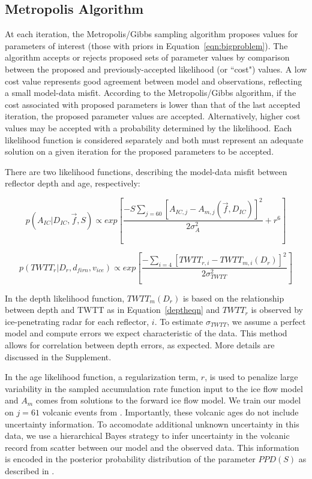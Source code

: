 \subsection{Metropolis Algorithm}\label{metrop}
At each iteration, the Metropolis/Gibbs sampling algorithm \citep{metropolis1953} proposes values for parameters of interest (those with priors in Equation~\ref{eqn:bigproblem}). The algorithm accepts or rejects proposed sets of parameter values by comparison between the proposed and previously-accepted likelihood (or ``cost") values. A low cost value represents good agreement between model and observations, reflecting a small model-data misfit. According to the Metropolis/Gibbs algorithm, if the cost associated with proposed parameters is lower than that of the last accepted iteration, the proposed parameter values are accepted. Alternatively, higher cost values may be accepted with a probability determined by the likelihood. Each likelihood function is considered separately and both must represent an adequate solution on a given iteration for the proposed parameters to be accepted.


There are two likelihood functions, describing the model-data misfit between reflector depth and age, respectively:


\begin{equation}\label{eqn:loglikeage}
p(A_{IC} | D_{IC},\vec{f},S) \propto exp[\frac{-S\sum_{j = 60}[A_{IC,j} - A_{m,j}(\vec{f},D_{IC})]^2}{2\sigma_A^2} + r^6]
\end{equation}

\begin{equation}\label{eqn:loglikedepth}
p(TWTT_r | D_r,d_{firn},v_{ice} ) \propto exp[\frac{-\sum_{i=4}[TWTT_{r,i} - TWTT_{m,i}(D_r)]^2}{2\sigma_{TWTT}^2}]
\end{equation}


In the depth likelihood function, $TWTT_m(D_r)$ is based on the relationship between depth and TWTT as in Equation~\ref{deptheqn} and $TWTT_r$ is observed by ice-penetrating radar for each reflector, $i$. To estimate $\sigma_{TWTT}$, we assume a perfect model and compute errors we expect characteristic of the data. This method allows for correlation between depth errors, as expected. More details are discussed in the Supplement.


In the age likelihood function, a regularization term, $r$, is used to penalize large variability in the sampled accumulation rate function input to the ice flow model and $A_m$ comes from solutions to the forward ice flow model. We train our model on $j=61$ volcanic events from \citet{hammer1997}. Importantly, these volcanic ages do not include uncertainty information. To accomodate additional unknown uncertainty in this data, we use a hierarchical Bayes strategy to infer uncertainty in the volcanic record from scatter between our model and the observed data. This information is encoded in the posterior probability distribution of the parameter $PPD(S)$ as described in \citet{jackson&huerta2016}. 

